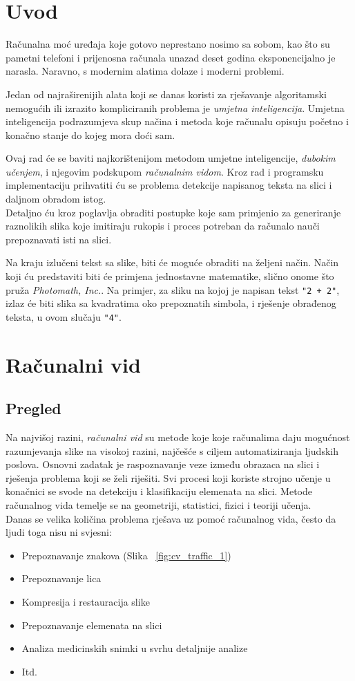 \section{Uvod}
Računalna moć uređaja koje gotovo neprestano nosimo sa sobom, kao što su pametni telefoni i prijenosna računala unazad deset godina eksponencijalno je narasla. 
Naravno, s modernim alatima dolaze i moderni problemi. 

Jedan od najraširenijih alata koji se danas koristi za rješavanje algoritamski nemogućih ili izrazito kompliciranih problema je \emph{umjetna inteligencija}.
Umjetna inteligencija podrazumjeva skup načina i metoda koje računalu opisuju početno i konačno stanje do kojeg mora doći sam.

Ovaj rad će se baviti najkorištenijom metodom umjetne inteligencije, \emph{dubokim učenjem}, i njegovim podskupom \emph{računalnim vidom}.
Kroz rad i programsku implementaciju prihvatiti ću se problema detekcije napisanog teksta na slici i daljnom obradom istog. \\
Detaljno ću kroz poglavlja obraditi postupke koje sam primjenio za generiranje raznolikih slika koje imitiraju rukopis i proces potreban da računalo nauči prepoznavati isti na slici.

Na kraju izlučeni tekst sa slike, biti će moguće obraditi na željeni način.
Način koji ću predstaviti biti će primjena jednostavne matematike, slično onome što pruža \emph{Photomath, Inc.}. 
Na primjer, za sliku na kojoj je napisan tekst \texttt{"2 + 2"}, izlaz će biti slika sa kvadratima oko prepoznatih simbola, i rješenje obrađenog teksta, u ovom slučaju \texttt{"4"}.

\section{Računalni vid}

\subsection{Pregled}
Na najvišoj razini, \emph{računalni vid} su metode koje koje računalima daju mogućnost razumjevanja slike na visokoj razini, najčešće s ciljem automatiziranja ljudskih poslova.
Osnovni zadatak je raspoznavanje veze između obrazaca na slici i rješenja problema koji se želi riješiti. 
Svi procesi koji koriste strojno učenje u konačnici se svode na  detekciju i klasifikaciju elemenata na slici.
Metode računalnog vida temelje se na geometriji, statistici, fizici i teoriji učenja. \\
Danas se velika količina problema rješava uz pomoć računalnog vida, često da ljudi toga nisu ni svjesni:
\begin{itemize}
\item Prepoznavanje znakova (Slika ~\ref{fig:cv_traffic_1})	
\item Prepoznavanje lica
\item Kompresija i restauracija slike
\item Prepoznavanje elemenata na slici
\item Analiza medicinskih snimki u svrhu detaljnije analize
\item Itd.
\end{itemize} 

